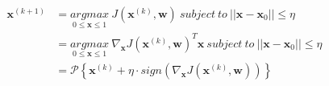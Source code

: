 \documentclass[11pt]{article}
\begin{document}
\begin{equation}
\begin{split}
\pmb{x}^{(k+1)}&=\underset{0\le \pmb{x}\le 1}{argmax}\ J(\pmb{x}^{(k)},\pmb{w})\ subject\ to\ ||\pmb{x}-\pmb{x}_0||\le\eta\\
&=\underset{0\le \pmb{x}\le 1}{argmax}\ \nabla_{\pmb{x}}J(\pmb{x}^{(k)},\pmb{w})^T\pmb{x}\ subject\ to\ ||\pmb{x}-\pmb{x}_0||\le\eta\\
&=\mathcal{P}\left\{\pmb{x}^{(k)}+\eta\cdot sign\left(\nabla_{\pmb{x}}J(\pmb{x}^{(k)},\pmb{w})\right)\right\}
\end{split}
\end{equation}
\end{document}
